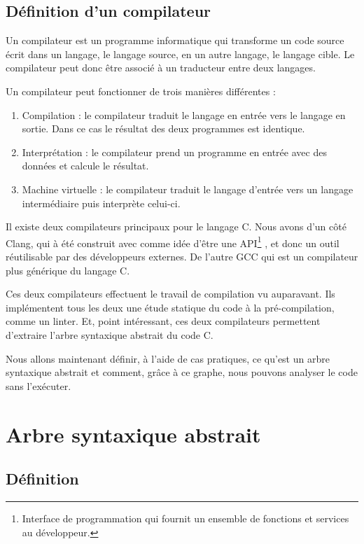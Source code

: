 \documentclass[12pt, twoside, openright]{report}
\begin{document}
\subsection{Définition d'un compilateur}

Un compilateur est un programme informatique qui transforme un code source écrit dans un langage, le langage source, en un autre langage, le langage cible. \cite{compilateur02} Le compilateur peut donc être associé à un traducteur entre deux langages. \cite{compilateur01}

Un compilateur peut fonctionner de trois manières différentes : 
\begin{enumerate}
    \item Compilation : le compilateur traduit le langage en entrée vers le langage en sortie. Dans ce cas le résultat des deux programmes est identique.
    \item Interprétation : le compilateur prend un programme en entrée avec des données et calcule le résultat.
    \item Machine virtuelle : le compilateur traduit le langage  d'entrée vers un langage intermédiaire puis interprète celui-ci.
\end{enumerate}

Il existe deux compilateurs principaux pour le langage C. Nous avons d'un côté Clang, qui à été construit avec comme idée d'être une API\footnote{Interface de programmation qui fournit un ensemble de fonctions et services au développeur.} \cite{clang01}, et donc un outil réutilisable par des développeurs externes. De l'autre GCC qui est un compilateur plus générique du langage C. 

Ces deux compilateurs effectuent le travail de compilation vu auparavant. Ils implémentent tous les deux une étude statique du code à la pré-compilation, comme un linter. Et, point intéressant, ces deux compilateurs permettent d'extraire l'arbre syntaxique abstrait du code C.

Nous allons maintenant définir, à l'aide de cas pratiques, ce qu'est un arbre syntaxique abstrait et comment, grâce à ce graphe, nous pouvons analyser le code sans l'exécuter. 

\section{Arbre syntaxique abstrait}

\subsection{Définition}
\end{document}
